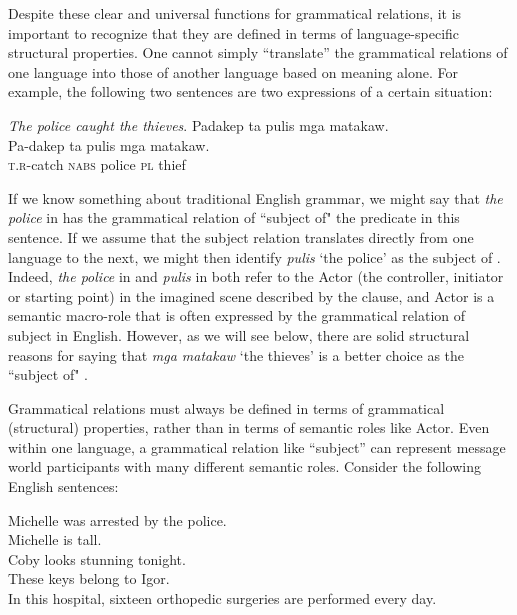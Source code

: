 Despite these clear and universal functions for grammatical relations, it is important to recognize that they are defined in terms of language-specific structural properties. One cannot simply “translate” the grammatical relations of one language into those of another language based on meaning alone. For example, the following two sentences are two expressions of a certain situation:

\ea \label{bkm:Ref482606160}
    \ea
    \label{ex:policecaughtthethief}
    \textit{The police caught the thieves}.
    \ex
    \label{ex:padakeptapulismgamatakaw}
    Padakep ta pulis mga matakaw. \\\smallskip
\gll Pa-dakep ta pulis mga matakaw. \\
    \textsc{t.r}-catch  \textsc{nabs}  police  \textsc{pl} thief   \\
    \z
\z

If we know something about traditional English grammar, we might say that \textit{the police} in  has the grammatical relation of “subject of" the predicate in this sentence. If we assume that the subject relation translates directly from one language to the next, we might then identify \textit{pulis} ‘the police’ as the subject of . Indeed, \textit{the police} in  and \textit{pulis} in  both refer to the Actor (the controller, initiator or starting point) in the imagined scene described by the clause, and Actor is a semantic macro-role that is often expressed by the grammatical relation of subject in English. However, as we will see below, there are solid structural reasons for saying that \textit{mga matakaw} ‘the thieves’ is a better choice as the “subject of" .

Grammatical relations must always be defined in terms of grammatical (structural) properties, rather than in terms of semantic roles like Actor. Even within one language, a grammatical relation like “subject” can represent message world participants with many different semantic roles. Consider the following English sentences:

\ea
\label{bkm:Ref482608282}
    \ea
    \label{ex:michellewasarrested}
    Michelle was arrested by the police. \\
    \ex
    \label{ex:michelleistall}
    Michelle is tall. \\
    \ex
    \label{ex:cobylooksstunning}
    Coby looks stunning tonight. \\
    \ex
    \label{ex:thesekeys}
    These keys belong to Igor. \\
    \ex
    \label{ex:inthishospital}
    In this hospital, sixteen orthopedic surgeries are performed every day.
    \z
\z

